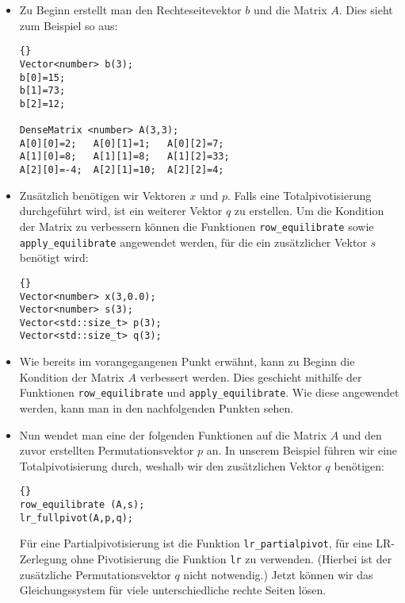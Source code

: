 \documentclass[a4paper,11pt]{article}
\theoremstyle{definition}
\begin{document}
\begin{itemize}
\item Zu Beginn erstellt man den Rechteseitevektor $b$ und die Matrix
  $A$. Dies sieht zum Beispiel so aus:

  {\footnotesize{\begin{lstlisting}{}
Vector<number> b(3);
b[0]=15;
b[1]=73;
b[2]=12;

DenseMatrix <number> A(3,3);
A[0][0]=2;   A[0][1]=1;   A[0][2]=7;
A[1][0]=8;   A[1][1]=8;   A[1][2]=33;
A[2][0]=-4;  A[2][1]=10;  A[2][2]=4;
\end{lstlisting}}}

\item Zusätzlich benötigen wir Vektoren $x$ und $p$. Falls eine
  Totalpivotisierung durchgeführt wird, ist ein weiterer Vektor $q$ zu
  erstellen. Um die Kondition der Matrix zu verbessern können die
  Funktionen \lstinline{row_equilibrate} sowie
  \lstinline{apply_equilibrate} angewendet werden, für die ein
  zusätzlicher Vektor $s$ benötigt wird:

  {\footnotesize{\begin{lstlisting}{}
Vector<number> x(3,0.0);
Vector<number> s(3);
Vector<std::size_t> p(3);
Vector<std::size_t> q(3);
\end{lstlisting}}}

\item Wie bereits im vorangegangenen Punkt erwähnt, kann zu Beginn die
  Kondition der Matrix $A$ verbessert werden. Dies geschieht mithilfe
  der Funktionen \lstinline{row_equilibrate} und
  \lstinline{apply_equilibrate}. Wie diese angewendet werden, kann man
  in den nachfolgenden Punkten sehen.

\item Nun wendet man eine der folgenden  Funktionen auf die Matrix $A$
  und den zuvor erstellten Permutationsvektor $p$ an. In unserem
  Beispiel führen wir eine Totalpivotisierung durch, weshalb wir den
  zusätzlichen Vektor $q$ benötigen:

  {\footnotesize{\begin{lstlisting}{}
row_equilibrate (A,s);
lr_fullpivot(A,p,q);
\end{lstlisting}}}

  Für eine Partialpivotisierung ist die Funktion
  \lstinline{lr_partialpivot}, für eine LR-Zerlegung ohne Pivotisierung
  die Funktion \lstinline{lr} zu verwenden. (Hierbei ist der zusätzliche
  Permutationsvektor $q$ nicht notwendig.)  Jetzt können wir das
  Gleichungssystem für viele unterschiedliche rechte Seiten lösen.


\end{itemize}
\end{document}
